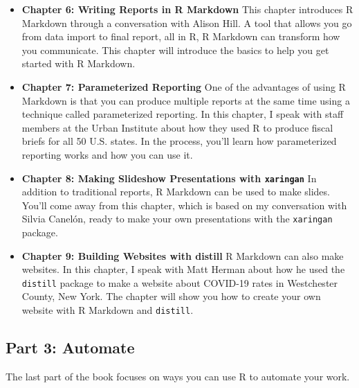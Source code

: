 \documentclass[
]{book}
\providecommand{\tightlist}{%
  \setlength{\itemsep}{0pt}\setlength{\parskip}{0pt}}
\begin{document}
\begin{itemize}
\tightlist
\item
  \textbf{Chapter 6: Writing Reports in R Markdown} This chapter introduces R Markdown through a conversation with Alison Hill. A tool that allows you go from data import to final report, all in R, R Markdown can transform how you communicate. This chapter will introduce the basics to help you get started with R Markdown.
\item
  \textbf{Chapter 7: Parameterized Reporting} One of the advantages of using R Markdown is that you can produce multiple reports at the same time using a technique called parameterized reporting. In this chapter, I speak with staff members at the Urban Institute about how they used R to produce fiscal briefs for all 50 U.S. states. In the process, you'll learn how parameterized reporting works and how you can use it.
\item
  \textbf{Chapter 8: Making Slideshow Presentations with \texttt{xaringan}} In addition to traditional reports, R Markdown can be used to make slides. You'll come away from this chapter, which is based on my conversation with Silvia Canelón, ready to make your own presentations with the \texttt{xaringan} package.
\item
  \textbf{Chapter 9: Building Websites with distill} R Markdown can also make websites. In this chapter, I speak with Matt Herman about how he used the \texttt{distill} package to make a website about COVID-19 rates in Westchester County, New York. The chapter will show you how to create your own website with R Markdown and \texttt{distill}.
\end{itemize}

\hypertarget{part-3-automate}{%
\subsection*{Part 3: Automate}\label{part-3-automate}}

The last part of the book focuses on ways you can use R to automate your work.
\end{document}
